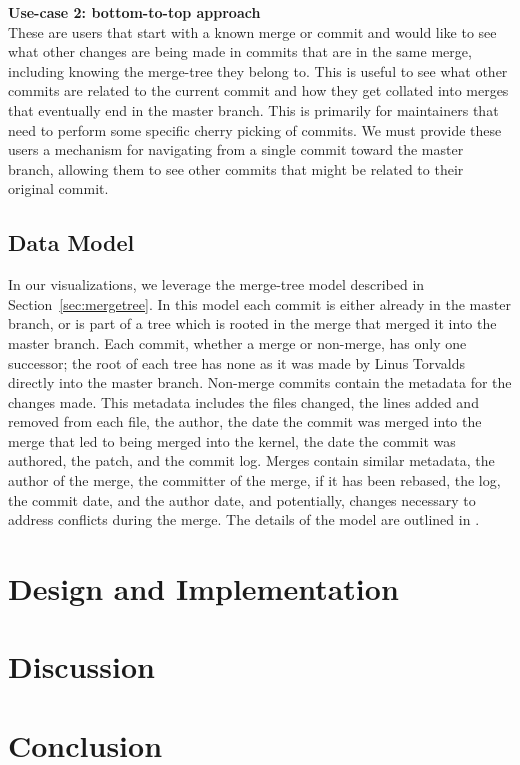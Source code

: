 \documentclass[draft]{IEEEtran}
\begin{document}
\noindent \textbf{Use-case 2: bottom-to-top
  approach}\label{sec:usecase2}\\ These are users that start with a
known merge or commit and would like to see what other changes are being
made in commits that are in the same merge, including knowing the
merge-tree they belong to. This is useful to see what other commits are
related to the current commit and how they get collated into merges that
eventually end in the master branch. This is primarily for maintainers
that need to perform some specific cherry picking of commits. We must
provide these users a mechanism for navigating from a single commit
toward the master branch, allowing them to see other commits that might
be related to their original commit.

\subsection{Data Model}

In our visualizations, we leverage the merge-tree model described in
Section~\ref{sec:mergetree}. In this model each commit is either already
in the master branch, or is part of a tree which is rooted in the merge
that merged it into the master branch.  Each commit, whether a merge or
non-merge, has only one successor; the root of each tree has none as it
was made by Linus Torvalds directly into the master branch. Non-merge
commits contain the metadata for the changes made.  This metadata
includes the files changed, the lines added and removed from each file,
the author, the date the commit was merged into the merge that led to
being merged into the kernel, the date the commit was authored, the
patch, and the commit log. Merges contain similar metadata,
the author of the merge, the committer of the merge, if it has been rebased, the log, the commit date, and the author date,
and potentially, changes necessary to address conflicts during the
merge. The details of the model are outlined in \cite{German2015}.


\section{Design and Implementation}







\section{Discussion}
\label{sec:discussion}



\section{Conclusion}
\label{sec:conclusion}



\balance




\end{document}
